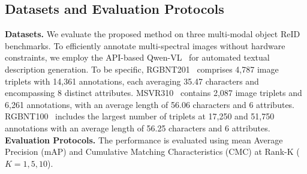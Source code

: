 \subsection{Datasets and Evaluation Protocols}
\textbf{Datasets.}
We evaluate the proposed method on three multi-modal object ReID benchmarks.
%
To efficiently annotate multi-spectral images without hardware constraints, we employ the API-based Qwen-VL~\cite{bai2023qwen} for automated textual description generation.
%
To be specific, RGBNT201~\cite{zheng2021robust} comprises 4,787 image triplets with 14,361 annotations, each averaging 35.47 characters and encompassing 8 distinct attributes. 
%
MSVR310~\cite{zheng2023cross} contains 2,087 image triplets and 6,261 annotations, with an average length of 56.06 characters and 6 attributes. 
%
RGBNT100~\cite{li2020multi} includes the largest number of triplets at 17,250 and 51,750 annotations with an average length of 56.25 characters and 6 attributes.
%
\\
\textbf{Evaluation Protocols.}
The performance is evaluated using mean Average Precision (mAP) and Cumulative Matching Characteristics (CMC) at Rank-K (\(K = 1, 5, 10\)). 
%
